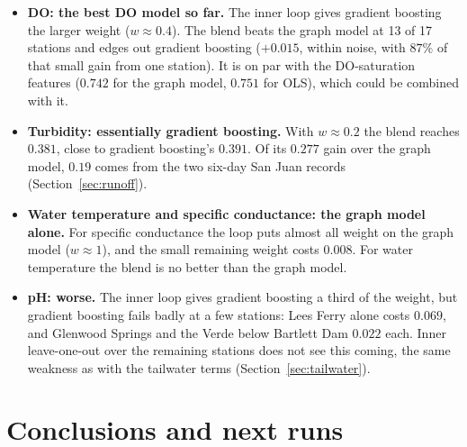 \documentclass[11pt]{article}
\begin{document}
\begin{itemize}
  \item \textbf{DO: the best DO model so far.} The inner loop gives gradient boosting the larger
        weight ($w\approx0.4$). The blend beats the graph model at 13 of 17 stations and edges
        out gradient boosting ($+0.015$, within noise, with $87\%$ of that small gain from one
        station). It is on par with the DO-saturation features ($0.742$ for the graph model,
        $0.751$ for OLS), which could be combined with it.
  \item \textbf{Turbidity: essentially gradient boosting.} With $w\approx0.2$ the blend reaches
        $0.381$, close to gradient boosting's $0.391$. Of its $0.277$ gain over the graph model,
        $0.19$ comes from the two six-day San Juan records (Section~\ref{sec:runoff}).
  \item \textbf{Water temperature and specific conductance: the graph model alone.} For
        specific conductance the loop puts almost all weight on the graph model ($w\approx1$),
        and the small remaining weight costs $0.008$. For water temperature the blend is no better
        than the graph model.
  \item \textbf{pH: worse.} The inner loop gives gradient boosting a third of the weight,
        but gradient boosting fails badly at a few stations: Lees Ferry alone costs $0.069$, and
        Glenwood Springs and the Verde below Bartlett Dam $0.022$ each. Inner leave-one-out over
        the remaining stations does not see this coming, the same weakness as with the tailwater
        terms (Section~\ref{sec:tailwater}).
\end{itemize}

\section{Conclusions and next runs}\label{sec:conclusions}
\end{document}
